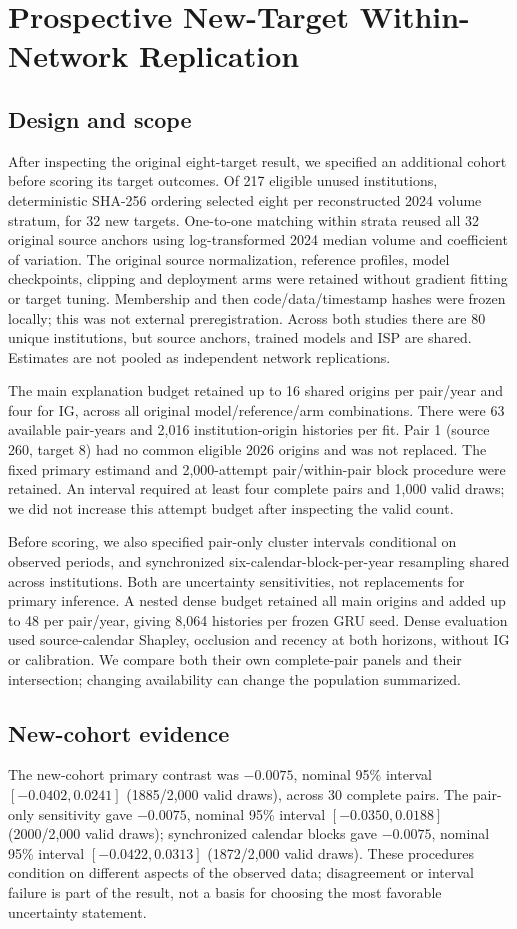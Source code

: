\section{Prospective New-Target Within-Network Replication}\label{sec:replication}
\subsection{Design and scope}
After inspecting the original eight-target result, we specified an additional cohort before scoring its target outcomes. Of 217 eligible unused institutions, deterministic SHA-256 ordering selected eight per reconstructed 2024 volume stratum, for 32 new targets. One-to-one matching within strata reused all 32 original source anchors using log-transformed 2024 median volume and coefficient of variation. The original source normalization, reference profiles, model checkpoints, clipping and deployment arms were retained without gradient fitting or target tuning. Membership and then code/data/timestamp hashes were frozen locally; this was not external preregistration. Across both studies there are 80 unique institutions, but source anchors, trained models and ISP are shared. Estimates are not pooled as independent network replications.

The main explanation budget retained up to 16 shared origins per pair/year and four for IG, across all original model/reference/arm combinations. There were 63 available pair-years and 2,016 institution-origin histories per fit. Pair 1 (source 260, target 8) had no common eligible 2026 origins and was not replaced. The fixed primary estimand and 2,000-attempt pair/within-pair block procedure were retained. An interval required at least four complete pairs and 1,000 valid draws; we did not increase this attempt budget after inspecting the valid count.

Before scoring, we also specified pair-only cluster intervals conditional on observed periods, and synchronized six-calendar-block-per-year resampling shared across institutions. Both are uncertainty sensitivities, not replacements for primary inference. A nested dense budget retained all main origins and added up to 48 per pair/year, giving 8,064 histories per frozen GRU seed. Dense evaluation used source-calendar Shapley, occlusion and recency at both horizons, without IG or calibration. We compare both their own complete-pair panels and their intersection; changing availability can change the population summarized.

\subsection{New-cohort evidence}
The new-cohort primary contrast was $-0.0075$, nominal 95\% interval $[-0.0402,0.0241]$ (1885/2,000 valid draws), across 30 complete pairs. The pair-only sensitivity gave $-0.0075$, nominal 95\% interval $[-0.0350,0.0188]$ (2000/2,000 valid draws); synchronized calendar blocks gave $-0.0075$, nominal 95\% interval $[-0.0422,0.0313]$ (1872/2,000 valid draws). These procedures condition on different aspects of the observed data; disagreement or interval failure is part of the result, not a basis for choosing the most favorable uncertainty statement.

